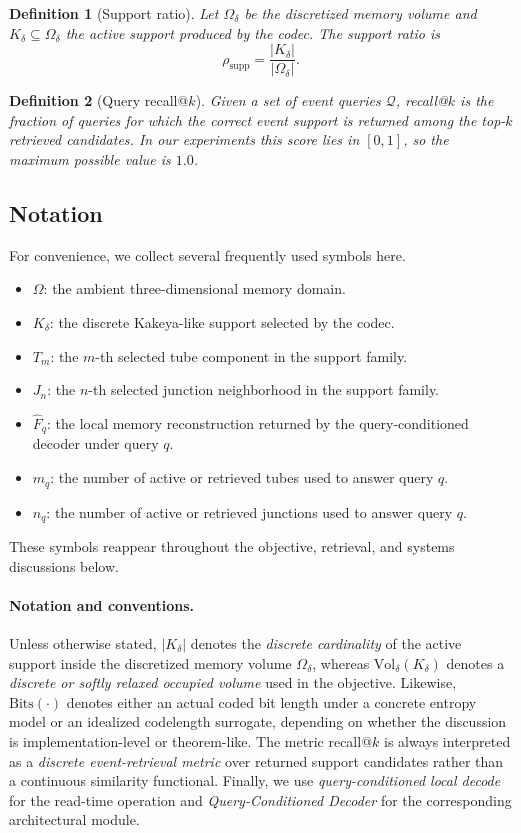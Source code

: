 \documentclass[11pt]{article}
\newtheorem{definition}{Definition}
\begin{document}
\begin{definition}[Support ratio]
Let $\Omega_\delta$ be the discretized memory volume and $K_\delta\subseteq\Omega_\delta$ the active support produced by the codec. The support ratio is
\begin{equation}
\rho_{\mathrm{supp}}=\frac{|K_\delta|}{|\Omega_\delta|}.
\end{equation}
\end{definition}

\begin{definition}[Query recall@$k$]
Given a set of event queries $\mathcal Q$, recall@$k$ is the fraction of queries for which the correct event support is returned among the top-$k$ retrieved candidates. In our experiments this score lies in $[0,1]$, so the maximum possible value is $1.0$.
\end{definition}

\subsection{Notation}
For convenience, we collect several frequently used symbols here.
\begin{itemize}[leftmargin=1.5em]
\item $\Omega$: the ambient three-dimensional memory domain.
\item $K_\delta$: the discrete Kakeya-like support selected by the codec.
\item $T_m$: the $m$-th selected tube component in the support family.
\item $J_n$: the $n$-th selected junction neighborhood in the support family.
\item $\hat F_q$: the local memory reconstruction returned by the query-conditioned decoder under query $q$.
\item $m_q$: the number of active or retrieved tubes used to answer query $q$.
\item $n_q$: the number of active or retrieved junctions used to answer query $q$.
\end{itemize}
These symbols reappear throughout the objective, retrieval, and systems discussions below.

\paragraph{Notation and conventions.}
Unless otherwise stated, $|K_\delta|$ denotes the \emph{discrete cardinality} of the active support inside the discretized memory volume $\Omega_\delta$, whereas $\mathrm{Vol}_\delta(K_\delta)$ denotes a \emph{discrete or softly relaxed occupied volume} used in the objective. Likewise, $\mathrm{Bits}(\cdot)$ denotes either an actual coded bit length under a concrete entropy model or an idealized codelength surrogate, depending on whether the discussion is implementation-level or theorem-like. The metric recall@$k$ is always interpreted as a \emph{discrete event-retrieval metric} over returned support candidates rather than a continuous similarity functional. Finally, we use \emph{query-conditioned local decode} for the read-time operation and \emph{Query-Conditioned Decoder} for the corresponding architectural module.
\end{document}
